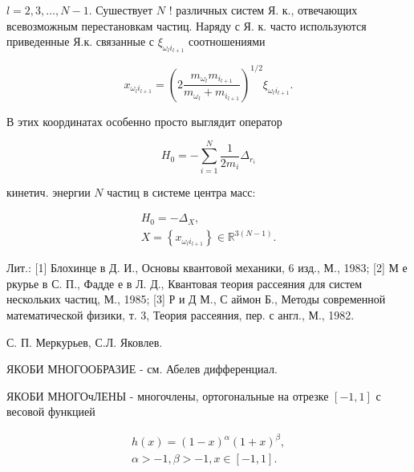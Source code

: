 \documentclass[10pt]{article}
\begin{document}
$l=2,3, \ldots, N-1$. Сушествует $N$ ! различных систем Я. к., отвечающих всевозможным перестановкам частиц. Наряду с Я. к. часто используются приведенные Я.к. связанные с $\xi_{\omega_{l} i_{l+1}}$ соотношениями



\[

x_{\omega_{l} i_{l+1}}=\left(2 \frac{m_{\omega_{l}} m_{i_{l+1}}}{m_{\omega_{l}}+m_{i_{l+1}}}\right)^{1 / 2} \xi_{\omega_{l} i_{l+1}} .

\]



В этих координатах особенно просто выглядит оператор



\[

H_{0}=-\sum_{i=1}^{N} \frac{1}{2 m_{i}} \Delta_{r_{i}}

\]



кинетич. энергии $N$ частиц в системе центра масс:



\[

\begin{gathered}

H_{0}=-\Delta_{X}, \\

X=\left\{x_{\omega_{l} i_{l+1}}\right\} \in \mathbb{R}^{3(N-1)} .

\end{gathered}

\]



Лит.: [1] Блохинце в Д. И., Основы квантовой механики, 6 изд., М., 1983; [2] М е ркурье в С. П., Фадде е в Л. Д., Квантовая теория рассеяния для систем нескольких частиц, М., 1985; [3] Р и Д М., С аймон Б., Методы современной математической физики, т. 3, Теория рассеяния, пер. с англ., М., 1982.



С. П. Меркурьев, С.Л. Яковлев.



ЯКОБИ МНОГООБРАЗИЕ - см. Абелев дифференциал.



ЯКОБИ МНОГОчЛЕНЫ - многочлены, ортогональные на отрезке $[-1,1]$ с весовой функцией



\[

\begin{gathered}

h(x)=(1-x)^{\alpha}(1+x)^{\beta}, \\

\alpha>-1, \beta>-1, x \in[-1,1] .

\end{gathered}

\]
\end{document}
